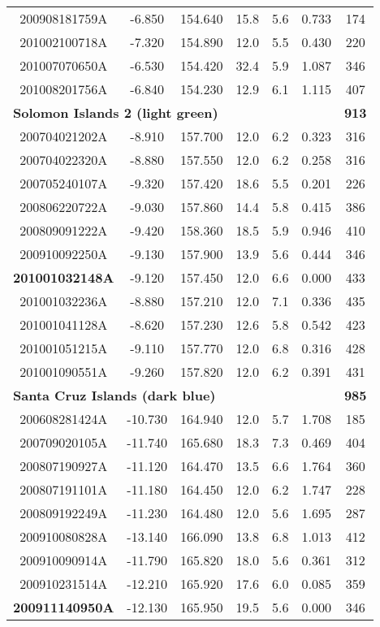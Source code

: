 \documentclass[12pt,oneside]{book}
\begin{document}
\begin{longtable}{ c c c c c c c }
200908181759A &-6.850 &154.640 &15.8 &5.6 &0.733 &174 \\
201002100718A &-7.320 &154.890 &12.0 &5.5 &0.430 &220 \\
201007070650A &-6.530 &154.420 &32.4 &5.9 &1.087 &346 \\
201008201756A &-6.840 &154.230 &12.9 &6.1 &1.115 &407 \\ \hline 
\multicolumn{3}{l}{\textbf{Solomon Islands 2 (light green)}} & & & &\textbf{913} \\
200704021202A &-8.910 &157.700 &12.0 &6.2 &0.323 &316 \\
200704022320A &-8.880 &157.550 &12.0 &6.2 &0.258 &316 \\
200705240107A &-9.320 &157.420 &18.6 &5.5 &0.201 &226 \\
200806220722A &-9.030 &157.860 &14.4 &5.8 &0.415 &386 \\
200809091222A &-9.420 &158.360 &18.5 &5.9 &0.946 &410 \\
200910092250A &-9.130 &157.900 &13.9 &5.6 &0.444 &346 \\
\textbf{201001032148A} &-9.120 &157.450 &12.0 &6.6 &0.000 &433 \\
201001032236A &-8.880 &157.210 &12.0 &7.1 &0.336 &435 \\
201001041128A &-8.620 &157.230 &12.6 &5.8 &0.542 &423 \\
201001051215A &-9.110 &157.770 &12.0 &6.8 &0.316 &428 \\
201001090551A &-9.260 &157.820 &12.0 &6.2 &0.391 &431 \\ \hline 
\multicolumn{3}{l}{\textbf{Santa Cruz Islands (dark blue)}} & & & &\textbf{985} \\
200608281424A &-10.730 &164.940 &12.0 &5.7 &1.708 &185 \\
200709020105A &-11.740 &165.680 &18.3 &7.3 &0.469 &404 \\
200807190927A &-11.120 &164.470 &13.5 &6.6 &1.764 &360 \\
200807191101A &-11.180 &164.450 &12.0 &6.2 &1.747 &228 \\
200809192249A &-11.230 &164.480 &12.0 &5.6 &1.695 &287 \\
200910080828A &-13.140 &166.090 &13.8 &6.8 &1.013 &412 \\
200910090914A &-11.790 &165.820 &18.0 &5.6 &0.361 &312 \\
200910231514A &-12.210 &165.920 &17.6 &6.0 &0.085 &359 \\
\textbf{200911140950A} &-12.130 &165.950 &19.5 &5.6 &0.000 &346 \\

\end{longtable}
\end{document}
